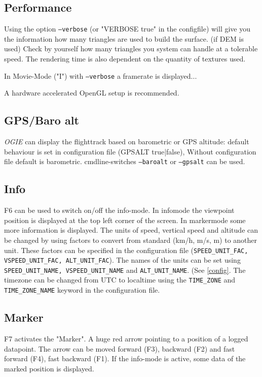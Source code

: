 \subsection{Performance}

Using the option \texttt{--verbose} (or "VERBOSE true"  in the configfile) will give you
the information how many triangles are used to build the surface. (if DEM is
used) Check by yourself how many triangles you system can handle at a tolerable
speed. The rendering time is also dependent on the quantity of textures used.

In Movie-Mode ("I") with \texttt{--verbose} a framerate is displayed...

A hardware accelerated OpenGL setup is recommended.





\subsection{GPS/Baro alt}

\emph{OGIE} can display the flighttrack based on barometric or GPS altitude:
default behaviour is set in configuration file (GPSALT true|false),
Without configuration file default is barometric.
cmdline-switches \texttt{--baroalt} or \texttt{--gpsalt} can be used.


\subsection{Info}
\label{info}
F6 can be used to switch on/off the info-mode. In infomode the viewpoint position is displayed
at the top left corner of the screen.
In markermode some more information is displayed. The units of speed, vertical speed and altitude can be changed by using factors to convert from standard (km/h, m/s, m) to another unit. These factors can be specified in the configuration file (\texttt{SPEED\_UNIT\_FAC, VSPEED\_UNIT\_FAC, ALT\_UNIT\_FAC}). The names of the units can be set using \texttt{SPEED\_UNIT\_NAME, VSPEED\_UNIT\_NAME} and \texttt{ALT\_UNIT\_NAME}. (See \ref{config}. The timezone can be changed from UTC to localtime using the \texttt{TIME\_ZONE} and \texttt{TIME\_ZONE\_NAME} keyword in the configuration file.


\subsection{Marker}
\label{marker}
F7 activates the "Marker". A huge red arrow pointing to a position of a logged datapoint.
The arrow can be moved forward (F3), backward (F2) and fast forward (F4),
fast backward (F1). If the info-mode is active, some data of the marked
position is displayed.


